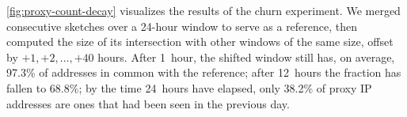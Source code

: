 \documentclass[letterpaper,twocolumn]{article}
\begin{document}
\autoref{fig:proxy-count-decay}
visualizes the results of the churn experiment.
We merged consecutive sketches over a 24-hour window
to serve as a reference,
then computed the size of its intersection
with other windows of the same size,
offset by \(+1, +2, \ldots, +40\) hours.
After 1~hour, the shifted window still has, on average,
97.3\% of addresses in common with the reference;
after 12~hours the fraction has fallen to 68.8\%;
by the time 24~hours have elapsed,
only 38.2\% of proxy IP addresses
are ones that had been seen in the previous day.
\end{document}
